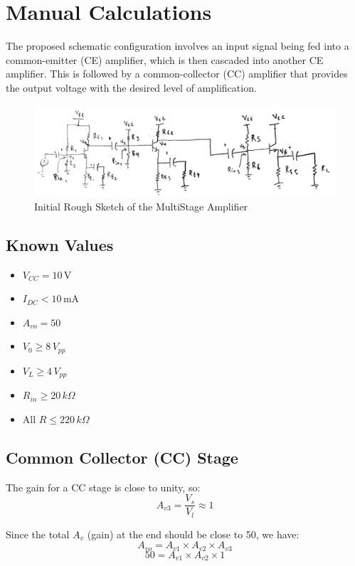 \chapter{{Manual Calculations}}
	
	{The proposed schematic configuration involves an input signal being fed into a common-emitter (CE) amplifier, which is then cascaded into another CE amplifier. This is followed by a common-collector (CC) amplifier that provides the output voltage with the desired level of amplification.}	
	
\begin{figure}[H]
    \centering
    \includegraphics[width=16cm]{Pictures/Initial-Rough.png}
    \caption{{Initial Rough Sketch of the MultiStage Amplifier}}
    \label{initial-dia}
\end{figure}	
	
\section{Known Values}
\begin{itemize}
    \item \( V_{CC} = 10 \, \text{V} \)
    \item \( I_{DC} < 10 \, \text{mA} \)
    \item \( A_{vo} = 50 \)
    \item \( V_0 \geq 8 \, V_{pp} \)
    \item \( V_L \geq 4 \, V_{pp} \)
    \item \( R_{in} \geq 20 \, k\Omega \)
    \item All \( R \leq 220 \, k\Omega \)
\end{itemize}

\section{Common Collector (CC) Stage}
The gain for a CC stage is close to unity, so:
\[
A_{v3} = \frac{V_s}{V_l} \approx 1
\]

Since the total \( A_v \) (gain) at the end should be close to 50, we have:
\[
A_{vo} = A_{v1} \times A_{v2} \times A_{v3}
\]
\[
50 = A_{v1} \times A_{v2} \times 1
\]


